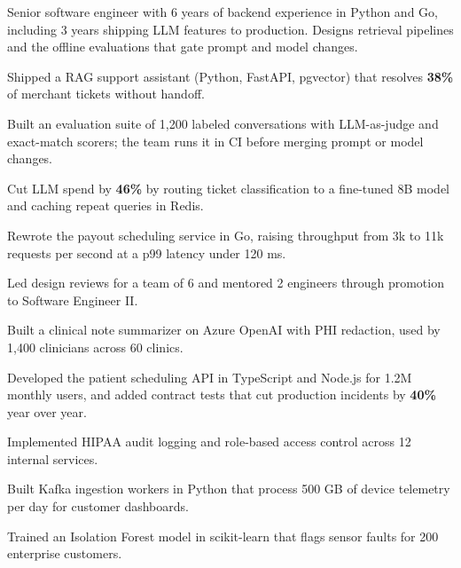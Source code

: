\begin{resumecolumns}
Senior software engineer with 6 years of backend experience in Python and Go,
including 3 years shipping LLM features to production. Designs retrieval pipelines
and the offline evaluations that gate prompt and model changes.

\begin{highlights}
  \item Shipped a RAG support assistant (Python, FastAPI, pgvector) that resolves
    \textbf{38\%} of merchant tickets without handoff.
  \item Built an evaluation suite of 1,200 labeled conversations with LLM-as-judge
    and exact-match scorers; the team runs it in CI before merging prompt or model changes.
  \item Cut LLM spend by \textbf{46\%} by routing ticket classification to a fine-tuned
    8B model and caching repeat queries in Redis.
  \item Rewrote the payout scheduling service in Go, raising throughput from 3k to
    11k requests per second at a p99 latency under 120 ms.
  \item Led design reviews for a team of 6 and mentored 2 engineers through
    promotion to Software Engineer II.
\end{highlights}

\begin{highlights}
  \item Built a clinical note summarizer on Azure OpenAI with PHI redaction, used by
    1,400 clinicians across 60 clinics.
  \item Developed the patient scheduling API in TypeScript and Node.js for 1.2M
    monthly users, and added contract tests that cut production incidents by
    \textbf{40\%} year over year.
  \item Implemented HIPAA audit logging and role-based access control across
    12 internal services.
\end{highlights}

\begin{highlights}
  \item Built Kafka ingestion workers in Python that process 500 GB of device
    telemetry per day for customer dashboards.
  \item Trained an Isolation Forest model in scikit-learn that flags sensor faults
    for 200 enterprise customers.
\end{highlights}


\end{resumecolumns}

